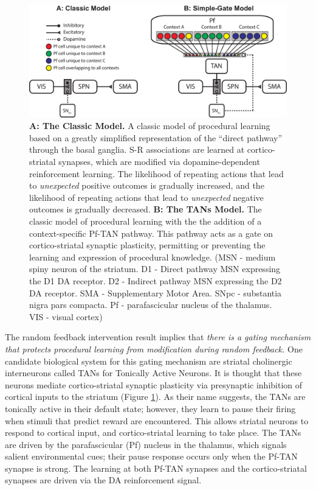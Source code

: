 \begin{figure}[h]
  \centering \includegraphics[width=1.0\textwidth]{../figures/fig_models.pdf}
  \caption{ \textbf{A: The Classic Model.} A classic model of procedural
    learning based on a greatly simplified representation of the ``direct pathway''
    through the basal ganglia. S-R associations are learned at cortico-striatal
    synapses, which are modified via dopamine-dependent reinforcement learning. The
    likelihood of repeating actions that lead to \emph{unexpected} positive outcomes
    is gradually increased, and the likelihood of repeating actions that lead to
    \emph{unexpected} negative outcomes is gradually decreased. \textbf{B: The
      TANs Model.} The classic model of procedural learning with the the
    addition of a context-specific Pf-TAN pathway. This pathway acts as a gate on
    cortico-striatal synaptic plasticity, permitting or preventing the learning and
    expression of procedural knowledge. (MSN - medium spiny neuron of the striatum. D1 -
    Direct pathway MSN expressing the D1 DA receptor. D2 - Indirect pathway MSN
    expressing the D2 DA receptor. SMA - Supplementary Motor Area. SNpc - substantia
    nigra pars compacta. Pf - parafascicular nucleus of the thalamus. VIS - visual
    cortex)}
  \label{fig:models}
\end{figure}

The random feedback intervention result implies that \textit{there is a gating
mechanism that protects procedural learning from modification during random
feedback.} One candidate biological system for this gating mechanism are
striatal cholinergic interneurons called TANs for Tonically Active Neurons. It
is thought that these neurons mediate cortico-striatal synaptic plasticity via
presynaptic inhibition of cortical inputs to the striatum (Figure
\ref{fig:models}). As their name suggests, the TANs are tonically active in
their default state; however, they learn to pause their firing when stimuli that
predict reward are encountered. This allows striatal neurons to respond to
cortical input, and cortico-striatal learning to take place. The TANs are driven
by the parafascicular (Pf) nucleus in the thalamus, which signals salient
environmental cues; their pause response occurs only when the Pf-TAN synapse is
strong. The learning at both Pf-TAN synapses and the cortico-striatal synapses
are driven via the DA reinforcement signal.


